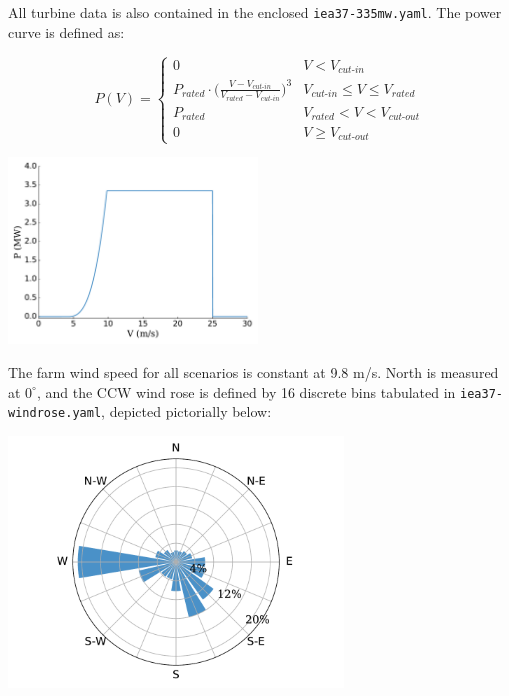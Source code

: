 \documentclass[10pt]{article}
\begin{document}
        \noindent All turbine data is also contained in the enclosed \texttt{iea37-335mw.yaml}. The power curve is defined as:   

        \begin{minipage}{0.53\textwidth}
            \begin{equation*}
                P(V) = 
                \begin{cases} 
                    0 & V < V_{\textit{cut-in}} \\
                    P_{\textit{rated}}\cdot\bigg(\frac{V-V_{\textit{cut-in}}}{V_{\textit{rated}}-V_{\textit{cut-in}}}\bigg)^3 & V_{\textit{cut-in}}\leq V \leq V_{\textit{rated}} \\
                    P_{\textit{rated}} & V_{\textit{rated}} < V < V_{\textit{cut-out}} \\
                    0 & V \geq V_{\textit{cut-out}}
                \end{cases}
            \label{eq:power}
            \end{equation*}
        \end{minipage}\quad
        \begin{minipage}{0.53\textwidth}
            \includegraphics[width=2.6in]{iea37-335mw-pcurve}
        \end{minipage}

        The farm wind speed for all scenarios is constant at 9.8 m/s. North is measured at $0^{\circ}$, and the CCW wind rose is defined by 16 discrete bins tabulated in \texttt{iea37-windrose.yaml}, depicted pictorially below:
        \begin{center}
            \includegraphics[width=3.5in]{iea37-windrose}
        \end{center}
        
\end{document}
